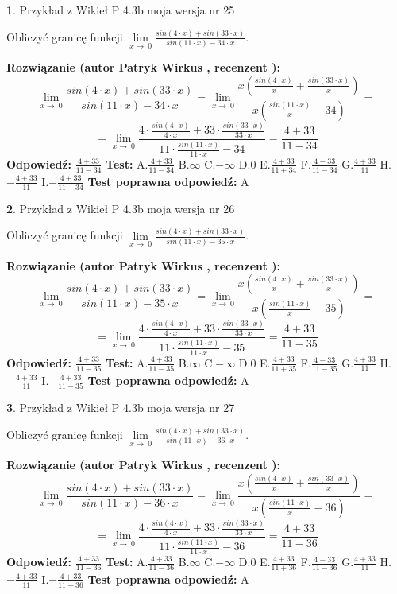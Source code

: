 \documentclass[12pt, a4paper]{article}
\theoremstyle{definition} %
\newtheorem{zad}{}
\newcommand{\zadStart}[1]{\begin{zad}#1\newline}
\newcommand{\zadStop}{\end{zad}}
\newcommand{\rozwStart}[2]{\noindent \textbf{Rozwiązanie (autor #1 , recenzent #2): }\newline}
\newcommand{\rozwStop}{\newline}
\newcommand{\odpStart}{\noindent \textbf{Odpowiedź:}\newline}
\newcommand{\odpStop}{\newline}
\newcommand{\testStart}{\noindent \textbf{Test:}\newline}
\newcommand{\testStop}{\newline}
\newcommand{\kluczStart}{\noindent \textbf{Test poprawna odpowiedź:}\newline}
\newcommand{\kluczStop}{\newline}
\begin{document}
\zadStart{Przykład z Wikieł P 4.3b moja wersja nr 25}


Obliczyć granicę funkcji $\lim\limits_{x\to\ 0}\frac{sin(4 \cdot x)+sin(33 \cdot x)}{sin(11 \cdot x)-34 \cdot x}$.
\zadStop
\rozwStart{Patryk Wirkus}{}
$$\lim\limits_{x\to\ 0}\frac{sin(4 \cdot x)+sin(33 \cdot x)}{sin(11 \cdot x)-34 \cdot x}=\lim\limits_{x\to\ 0}\frac{x(\frac{sin(4 \cdot x)}{x}+\frac{sin(33 \cdot x)}{x})}{x(\frac{sin(11 \cdot x)}{x}-34)}=$$
$$=\lim\limits_{x\to\ 0}\frac{4 \cdot \frac{sin(4 \cdot x)}{4 \cdot x}+33 \cdot \frac{sin(33 \cdot x)}{33 \cdot x}}{11 \cdot \frac{sin(11 \cdot x)}{11 \cdot x}-34}=\frac{4+33}{11-34}$$
\rozwStop
\odpStart
$\frac{4+33}{11-34}$
\odpStop
\testStart
A.$\frac{4+33}{11-34}$
B.$\infty$
C.$-\infty$
D.$0$
E.$\frac{4+33}{11+34}$
F.$\frac{4-33}{11-34}$
G.$\frac{4+33}{11}$
H.$-\frac{4+33}{11}$
I.$-\frac{4+33}{11-34}$
\testStop
\kluczStart
A
\kluczStop



\zadStart{Przykład z Wikieł P 4.3b moja wersja nr 26}


Obliczyć granicę funkcji $\lim\limits_{x\to\ 0}\frac{sin(4 \cdot x)+sin(33 \cdot x)}{sin(11 \cdot x)-35 \cdot x}$.
\zadStop
\rozwStart{Patryk Wirkus}{}
$$\lim\limits_{x\to\ 0}\frac{sin(4 \cdot x)+sin(33 \cdot x)}{sin(11 \cdot x)-35 \cdot x}=\lim\limits_{x\to\ 0}\frac{x(\frac{sin(4 \cdot x)}{x}+\frac{sin(33 \cdot x)}{x})}{x(\frac{sin(11 \cdot x)}{x}-35)}=$$
$$=\lim\limits_{x\to\ 0}\frac{4 \cdot \frac{sin(4 \cdot x)}{4 \cdot x}+33 \cdot \frac{sin(33 \cdot x)}{33 \cdot x}}{11 \cdot \frac{sin(11 \cdot x)}{11 \cdot x}-35}=\frac{4+33}{11-35}$$
\rozwStop
\odpStart
$\frac{4+33}{11-35}$
\odpStop
\testStart
A.$\frac{4+33}{11-35}$
B.$\infty$
C.$-\infty$
D.$0$
E.$\frac{4+33}{11+35}$
F.$\frac{4-33}{11-35}$
G.$\frac{4+33}{11}$
H.$-\frac{4+33}{11}$
I.$-\frac{4+33}{11-35}$
\testStop
\kluczStart
A
\kluczStop



\zadStart{Przykład z Wikieł P 4.3b moja wersja nr 27}


Obliczyć granicę funkcji $\lim\limits_{x\to\ 0}\frac{sin(4 \cdot x)+sin(33 \cdot x)}{sin(11 \cdot x)-36 \cdot x}$.
\zadStop
\rozwStart{Patryk Wirkus}{}
$$\lim\limits_{x\to\ 0}\frac{sin(4 \cdot x)+sin(33 \cdot x)}{sin(11 \cdot x)-36 \cdot x}=\lim\limits_{x\to\ 0}\frac{x(\frac{sin(4 \cdot x)}{x}+\frac{sin(33 \cdot x)}{x})}{x(\frac{sin(11 \cdot x)}{x}-36)}=$$
$$=\lim\limits_{x\to\ 0}\frac{4 \cdot \frac{sin(4 \cdot x)}{4 \cdot x}+33 \cdot \frac{sin(33 \cdot x)}{33 \cdot x}}{11 \cdot \frac{sin(11 \cdot x)}{11 \cdot x}-36}=\frac{4+33}{11-36}$$
\rozwStop
\odpStart
$\frac{4+33}{11-36}$
\odpStop
\testStart
A.$\frac{4+33}{11-36}$
B.$\infty$
C.$-\infty$
D.$0$
E.$\frac{4+33}{11+36}$
F.$\frac{4-33}{11-36}$
G.$\frac{4+33}{11}$
H.$-\frac{4+33}{11}$
I.$-\frac{4+33}{11-36}$
\testStop
\kluczStart
A
\kluczStop
\end{document}
